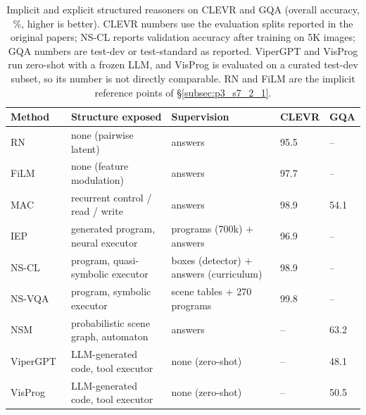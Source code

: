 \begin{table}[!ht]
    \centering
    \caption{Implicit and explicit structured reasoners on CLEVR and GQA (overall accuracy, \%, higher is better). CLEVR numbers use the evaluation splits reported in the original papers; NS-CL reports validation accuracy after training on 5K images; GQA numbers are test-dev or test-standard as reported. ViperGPT and VisProg run zero-shot with a frozen LLM, and VisProg is evaluated on a curated test-dev subset, so its number is not directly comparable. RN and FiLM are the implicit reference points of §\ref{subsec:p3_s7_2_1}.}
    \label{tab:p3_s7_2_2_clevr_gqa}
    \fontsize{9}{11}\selectfont
    \setlength{\tabcolsep}{1.5mm}
    \begin{tabular}{L{0.22\textwidth} L{0.26\textwidth} L{0.20\textwidth} C{0.10\textwidth} C{0.10\textwidth}}
        \toprule
        \textbf{Method} & \textbf{Structure exposed} & \textbf{Supervision} & \textbf{CLEVR} & \textbf{GQA} \\
        \midrule
        RN~\cite{santoro2017simple}            & none (pairwise latent)              & answers                       & 95.5 & --   \\
        FiLM~\cite{perez2018film}              & none (feature modulation)           & answers                       & 97.7 & --   \\
        MAC~\cite{hudson2018compositional}     & recurrent control / read / write    & answers                       & 98.9 & 54.1 \\
        IEP~\cite{johnson2017inferring}        & generated program, neural executor  & programs (700k) $+$ answers   & 96.9 & --   \\
        NS-CL~\cite{mao2019neuro}              & program, quasi-symbolic executor    & boxes (detector) $+$ answers (curriculum) & 98.9 & --   \\
        NS-VQA~\cite{yi2018neural}             & program, symbolic executor          & scene tables $+$ 270 programs & 99.8 & --   \\
        NSM~\cite{hudson2019learning}          & probabilistic scene graph, automaton & answers                      & --   & 63.2 \\
        ViperGPT~\cite{suris2023vipergpt}      & LLM-generated code, tool executor   & none (zero-shot)              & --   & 48.1 \\
        VisProg~\cite{gupta2023visual}         & LLM-generated code, tool executor   & none (zero-shot)              & --   & 50.5 \\
        \bottomrule
    \end{tabular}
\end{table}



